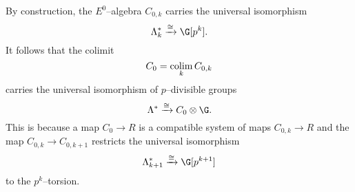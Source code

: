 By construction, the $E^0$--algebra $C_{0,k}$ carries the universal isomorphism
\[
\Lk^* \xrightarrow{\cong} \G[p^k].
\]
It follows that the colimit \[C_0 = \operatorname*{colim}_{k} C_{0,k}\] carries the universal isomorphism of $p$--divisible groups
\[
\Lambda^* \xrightarrow{\cong} C_0 \otimes \G.
\]
This is because a map $C_0 \rightarrow R$ is a compatible system of maps $C_{0,k} \rightarrow R$ and the map $C_{0,k} \rightarrow C_{0,k+1}$ restricts the universal isomorphism
\[
\Lambda_{k+1}^{*} \xrightarrow{\cong} \G[p^{k+1}]
\]
to the $p^k$--torsion.
%
%





